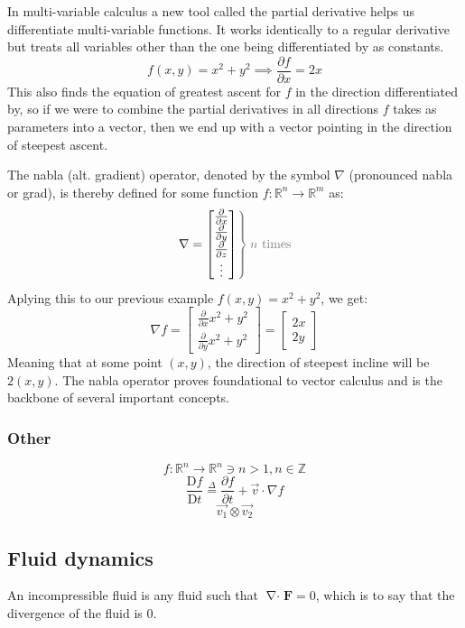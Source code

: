 \documentclass[a4paper, 12pt]{article} %
\newcommand{\fatf}{\mathbf{F}} %
\newcommand{\definedas}{\stackrel{\Delta}{=}} %
\newcommand{\partialder}[2]{\frac{\partial #1}{\partial #2}} %
\newcommand{\materialder}[2]{\frac{\mathrm{D} #1}{\mathrm{D} #2}} %
\DeclareMathOperator{\divergence}{\nabla\cdot} %
\begin{document}
In multi-variable calculus a new tool called the partial derivative helps us differentiate multi-variable functions. It works identically to a regular derivative but treats all variables other than the one being differentiated by as constants.
$$f(x,y)=x^2+y^2\implies\partialder{f}{x}=2x$$
This also finds the equation of greatest ascent for $f$ in the direction differentiated by, so if we were to combine the partial derivatives in all directions $f$ takes as parameters into a vector, then we end up with a vector pointing in the direction of steepest ascent.

The nabla (alt. gradient) operator, denoted by the symbol $\nabla$ (pronounced nabla or grad), is thereby defined for some function $f:\mathbb{R}^n\rightarrow\mathbb{R}^m$ as:
\begin{equation}
	\left.\nabla=
	\begin{bmatrix}
		\partialder{}{x} \\
		\partialder{}{y} \\
		\partialder{}{z} \\ 
		\vdots 	         \\
	\end{bmatrix}
	\color{gray}\right\} \color{gray}n\text{ times}\color{black}
\end{equation}
Aplying this to our previous example $f(x,y)=x^2+y^2$, we get:
$$\nabla f=\begin{bmatrix}
	\partialder{}{x}x^2+y^2\\
	\partialder{}{y}x^2+y^2	
\end{bmatrix}=\begin{bmatrix}
	2x\\
	2y
\end{bmatrix}$$
Meaning that at some point $(x,y)$, the direction of steepest incline will be $2(x,y)$. The nabla operator proves foundational to vector calculus and is the backbone of several important concepts.

\subsubsection{Other}
$$f:\mathbb{R}^n\rightarrow\mathbb{R}^n\ni n>1,n\in\mathbb{Z}$$
\begin{equation}
	\materialder{f}{t}\definedas\partialder{f}{t}+\vec{v}\cdot\nabla f
\end{equation}
$$\vec{v_1}\otimes\vec{v_2}$$

\subsection{Fluid dynamics}
An incompressible fluid is any fluid such that $\divergence\fatf=0$, which is to say that the divergence of the fluid is 0.
\end{document}

